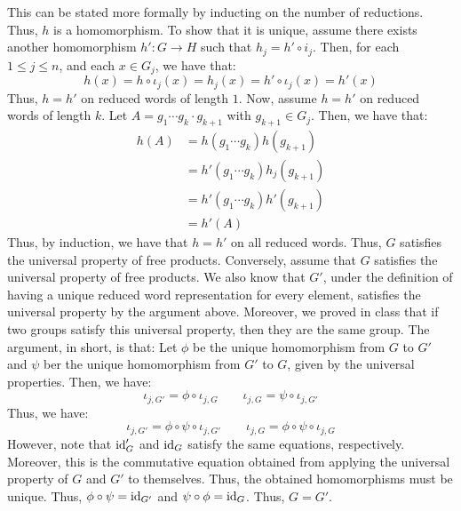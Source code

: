 \documentclass[12pt]{article}
\begin{document}
\begin{solution}
\begin{enumerate}
    \end{enumerate}
    This can be stated more formally by inducting on the number of reductions. Thus, $h$ is a homomorphism. To show that it is unique, assume there exists another homomorphism $h': G \to H$ such that $h_j = h' \circ i_j$. Then, for each $1 \leq j \leq n$, and each $x \in G_j$, we have that: 
    \[ h(x) = h \circ \iota_j(x) = h_j(x) = h' \circ \iota_j(x) = h'(x) \]
    Thus, $h = h'$ on reduced words of length $1$. Now, assume $h = h'$ on reduced words of length $k$. Let $A = g_1 \cdots g_k \cdot g_{k+1}$ with $g_{k+1} \in G_j$. Then, we have that:
    \begin{align*}
        h(A) &= h(g_1 \cdots g_k)h(g_{k+1}) \\
        &= h'(g_1 \cdots g_k)h_{j}(g_{k+1}) \\
        &= h'(g_1 \cdots g_k)h'(g_{k+1}) \\
        &= h'(A)
    \end{align*}
    Thus, by induction, we have that $h = h'$ on all reduced words. Thus, $G$ satisfies the universal property of free products. \bbni 
    Conversely, assume that $G$ satisfies the universal property of free products. We also know that $G'$, under the definition of having a unique reduced word representation for every element, satisfies the universal property by the argument above. Moreover, we proved in class that if two groups satisfy this universal property, then they are the same group. The argument, in short, is that: Let $\phi$ be the unique homomorphism from $G$ to $G'$ and $\psi$ ber the unique homomorphism from $G'$ to $G$, given by the universal properties. Then, we have: 
    \[ \iota_{j, G'} = \phi \circ \iota_{j, G} \qquad \iota_{j, G} = \psi \circ \iota_{j, G'} \]
    Thus, we have:
    \[ \iota_{j, G'} = \phi \circ \psi \circ \iota_{j, G'} \qquad \iota_{j, G} = \phi \circ \psi \circ \iota_{j, G} \]
    However, note that $\operatorname{id}_G'$ and $\operatorname{id}_G$ satisfy the same equations, respectively. Moreover, this is the commutative equation obtained from applying the universal property of $G$ and $G'$ to themselves. Thus, the obtained homomorphisms must be unique. Thus, $\phi \circ \psi = \operatorname{id}_{G'}$ and $\psi \circ \phi = \operatorname{id}_G$. Thus, $G = G'$.
\end{solution}
\newpage
\end{document}
